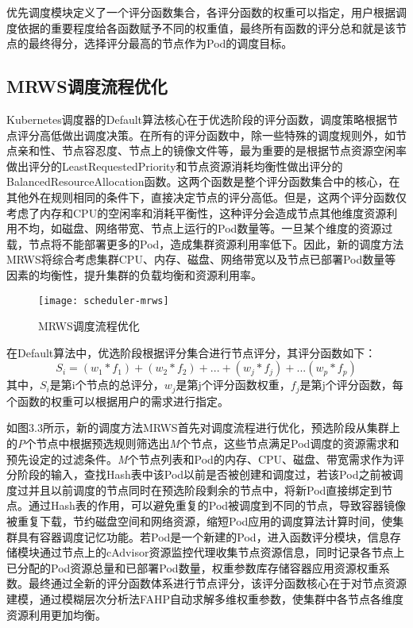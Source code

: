 优先调度模块定义了一个评分函数集合，各评分函数的权重可以指定，用户根据调度依据的重要程度给各函数赋予不同的权重值，最终所有函数的评分总和就是该节点的最终得分，选择评分最高的节点作为Pod的调度目标。

\subsection{MRWS调度流程优化}
Kubernetes调度器的Default算法核心在于优选阶段的评分函数，调度策略根据节点评分高低做出调度决策。在所有的评分函数中，除一些特殊的调度规则外，如节点亲和性、节点容忍度、节点上的镜像文件等，最为重要的是根据节点资源空闲率做出评分的LeastRequestedPriority和节点资源消耗均衡性做出评分的BalancedResourceAllocation函数。这两个函数是整个评分函数集合中的核心，在其他外在规则相同的条件下，直接决定节点的评分高低。但是，这两个评分函数仅考虑了内存和CPU的空闲率和消耗平衡性，这种评分会造成节点其他维度资源利用不均，如磁盘、网络带宽、节点上运行的Pod数量等。一旦某个维度的资源过载，节点将不能部署更多的Pod，造成集群资源利用率低下。因此，新的调度方法MRWS将综合考虑集群CPU、内存、磁盘、网络带宽以及节点已部署Pod数量等因素的均衡性，提升集群的负载均衡和资源利用率。
\begin{figure}[H] %
	\centering
	\texttt{[image: scheduler-mrws]}
	\caption{MRWS调度流程优化}
\end{figure}
在Default算法中，优选阶段根据评分集合进行节点评分，其评分函数如下：
\begin{equation}
	S_{i} = (w_{1}*f_{1})+(w_{2}*f_{2})+...+(w_{j}*f_{j})+...(w_{p}*f_{p})
\end{equation}
其中，\begin{math}S_{i}\end{math}是第i个节点的总评分，\begin{math}w_{j}\end{math}是第j个评分函数权重，\begin{math}f_{j}\end{math}是第j个评分函数，每个函数的权重可以根据用户的需求进行指定。

如图3.3所示，新的调度方法MRWS首先对调度流程进行优化，预选阶段从集群上的\emph{P}个节点中根据预选规则筛选出\emph{M}个节点，这些节点满足Pod调度的资源需求和预先设定的过滤条件。\emph{M}个节点列表和Pod的内存、CPU、磁盘、带宽需求作为评分阶段的输入，查找Hash表中该Pod以前是否被创建和调度过，若该Pod之前被调度过并且以前调度的节点同时在预选阶段剩余的节点中，将新Pod直接绑定到节点。通过Hash表的作用，可以避免重复的Pod被调度到不同的节点，导致容器镜像被重复下载，节约磁盘空间和网络资源，缩短Pod应用的调度算法计算时间，使集群具有容器调度记忆功能。若Pod是一个新建的Pod，进入函数评分模块，信息存储模块通过节点上的cAdvisor资源监控代理收集节点资源信息，同时记录各节点上已分配的Pod资源总量和已部署Pod数量，权重参数库存储容器应用资源权重系数。最终通过全新的评分函数体系进行节点评分，该评分函数核心在于对节点资源建模，通过模糊层次分析法FAHP自动求解多维权重参数，使集群中各节点各维度资源利用更加均衡。

